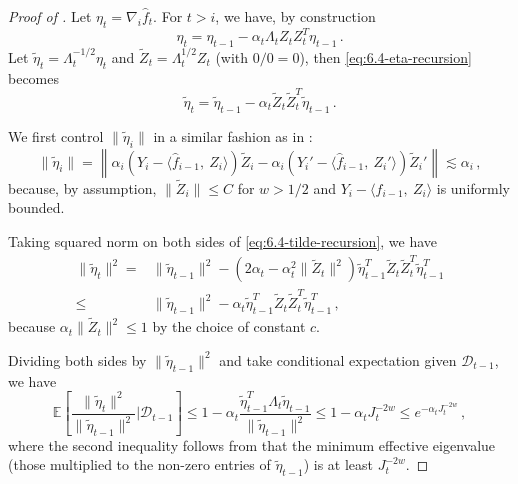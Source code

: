 \documentclass[11pt]{article}
\theoremstyle{plain}
\newcommand{\D}{{\mathcal{D}}}
\begin{document}
\begin{proof}[Proof of ]
Let $\eta_t=\nabla_i \hat f_t$.
For $t>i$, we have, by construction
\begin{equation}
    \label{eq:6.4-eta-recursion}
\eta_t = \eta_{t-1}-\alpha_t \Lambda_t Z_t Z_t^T\eta_{t-1}\,.
\end{equation}
Let $\tilde\eta_t=\Lambda_t^{-1/2}\eta_t$ and $\tilde Z_t = \Lambda_t^{1/2} Z_t$ (with $0/0=0$), then \eqref{eq:6.4-eta-recursion} becomes
\begin{equation}
    \label{eq:6.4-tilde-recursion}
    \tilde\eta_t=\tilde\eta_{t-1}-\alpha_t \tilde Z_t\tilde Z_t^T\tilde\eta_{t-1}\,.
\end{equation}

We first control $\|\tilde\eta_i\|$ in a similar fashion as in :
\begin{equation}
    \|\tilde\eta_i\| =  \left\|\alpha_i(Y_i-\langle \hat f_{i-1},~Z_i\rangle)\tilde Z_i-\alpha_i(Y_i'-\langle \hat f_{i-1},~Z_i'\rangle)\tilde Z_i'\right\|
    \lesssim  \alpha_i\,,    \label{eq:6.4-eta_i-bound}
\end{equation}
because, by assumption, $\|\tilde Z_i\|\le C$ for $w>1/2$ and $Y_i-\langle \hat f_{i-1},~Z_i\rangle$ is uniformly bounded.

Taking squared norm on both sides of \eqref{eq:6.4-tilde-recursion}, we have
\begin{align*}
    \|\tilde \eta_t\|^2 = & \|\tilde\eta_{t-1}\|^2 - (2\alpha_t-\alpha_t^2\|\tilde Z_t\|^2)\tilde\eta_{t-1}^T\tilde Z_t\tilde Z_t^T\tilde\eta_{t-1}^T\nonumber\\
    \le &\|\tilde\eta_{t-1}\|^2 - \alpha_t\tilde\eta_{t-1}^T\tilde Z_t\tilde Z_t^T\tilde\eta_{t-1}^T\,,
\end{align*}
because $\alpha_t\|\tilde Z_t\|^2\le 1$ by the choice of constant $c$.

Dividing both sides by $\|\tilde\eta_{t-1}\|^2$ and take conditional expectation given $\D_{t-1}$, we have
\begin{equation}
    \label{eq:6.4-square-norm-rec}
    \mathbb E\left[\frac{\|\tilde\eta_t\|^2}{\|\tilde\eta_{t-1}\|^2}\bigg|\D_{t-1}\right]\le 1-\alpha_t\frac{\tilde\eta_{t-1}^T\Lambda_t\tilde\eta_{t-1}}{\|\tilde\eta_{t-1}\|^2}\le 1-\alpha_t J_t^{-2w}\le e^{-\alpha_t J_t^{-2w}}\,,
\end{equation}
where the second inequality follows from that the minimum effective eigenvalue (those multiplied to the non-zero entries of $\tilde \eta_{t-1}$) is at least $J_t^{-2w}$.


\end{proof}
\end{document}
